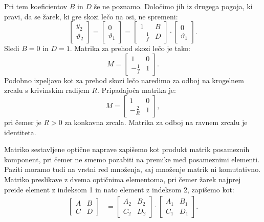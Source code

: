 Pri tem koeficientov $B$ in $D$ še ne poznamo. Določimo jih iz drugega pogoja, 
ki pravi, da se žarek, ki gre skozi lečo na osi, ne spremeni:
\begin{equation}
\left[\begin{array}{c}
y_{2}\\
\vartheta_{2}
\end{array}\right]=\left[\begin{array}{c}
0\\
\vartheta_{1}
\end{array}\right]=\left[\begin{array}{cc}
1 & B\\
-\frac{1}{f} & D
\end{array}\right]\cdot\left[\begin{array}{c}
0\\
\vartheta_{1}
\end{array}\right]\!\!.
\end{equation}
 Sledi $B=0$ in $D=1$. Matrika za prehod skozi lečo je tako: 
\begin{equation}
M= \left[\begin{array}{cc}
1 & 0\\
-\frac{1}{f} & 1
\end{array}\right]\!\!.
\label{eq:MABCD2}
\end{equation}
Podobno izpeljavo kot za prehod skozi lečo naredimo za odboj na krogelnem zrcalu
s krivinskim radijem $R$. Pripadajoča matrika je:
\begin{equation}
M=\left[\begin{array}{cc}
1 & 0\\
-\frac{2}{R} & 1
\end{array}\right]\!\!,
\end{equation}
pri čemer je $R>0$ za konkavna zrcala. Matrika za odboj na ravnem zrcalu je identiteta.

Matriko sestavljene optične naprave zapišemo kot produkt matrik posameznih komponent, pri čemer
ne smemo pozabiti na premike med posameznimi elementi. Paziti moramo tudi na 
vrstni red množenja, saj množenje matrik ni komutativno.
Matriko preslikave z dvema optičnima elementoma, pri čemer žarek 
najprej preide element z indeksom 1 in nato element z indeksom 2, zapišemo kot:
\begin{align}
\left[\begin{array}{cc}
A & B\\
C & D
\end{array}\right] & =  \left[\begin{array}{cc}
A_{2} & B_{2}\\
C_{2} & D_{2}
\end{array}\right]\cdot\left[\begin{array}{cc}
A_{1} & B_{1}\\
C_{1} & D_{1}
\end{array}\right]\!\!.
\end{align}

